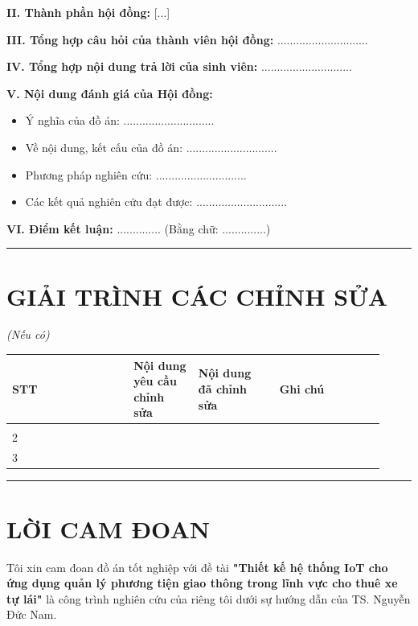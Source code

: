 \documentclass[13pt,a4paper]{extarticle}
\newcounter{none} %
\newcommand{\thesislongtableorignewline}{}
\let\thesislongtableorignewline\\
\renewcommand{\\}{\thesislongtableorignewline\hline}%
\let\\\thesislongtableorignewline
\newcommand{\majorheading}[1]{\clearpage\section*{#1}}
\newcommand{\frontmatterstart}{\clearpage\pagenumbering{roman}\setcounter{page}{1}}
\providecommand{\tightlist}{%
  \setlength{\itemsep}{0pt}\setlength{\parskip}{0pt}}
\begin{document}
\textbf{II. Thành phần hội đồng:} {[}...{]}

\textbf{III. Tổng hợp câu hỏi của thành viên hội đồng:}
.............................

\textbf{IV. Tổng hợp nội dung trả lời của sinh viên:}
.............................

\textbf{V. Nội dung đánh giá của Hội đồng:}

\begin{itemize}
\tightlist
\item
  Ý nghĩa của đồ án: .............................
\item
  Về nội dung, kết cấu của đồ án: .............................
\item
  Phương pháp nghiên cứu: .............................
\item
  Các kết quả nghiên cứu đạt được: .............................
\end{itemize}

\textbf{VI. Điểm kết luận:} .............. (Bằng chữ: ..............)

\begin{center}\rule{0.5\linewidth}{0.5pt}\end{center}

\majorheading{GIẢI TRÌNH CÁC CHỈNH SỬA}

\emph{(Nếu có)}

{\def\LTcaptype{none} %
\begin{longtable}{|p{0.30\linewidth}|p{0.16\linewidth}|p{0.20\linewidth}|p{0.26\linewidth}|}
\hline \textbf{STT} & \textbf{Nội dung yêu cầu chỉnh sửa} & \textbf{Nội dung đã chỉnh sửa} & \textbf{Ghi chú} \\
\hline
\endhead
\hline
\endlastfoot
1 & & & \\
2 & & & \\
3 & & & \\
\end{longtable}
}

\begin{center}\rule{0.5\linewidth}{0.5pt}\end{center}

\frontmatterstart
\majorheading{LỜI CAM ĐOAN}\label{lux1eddi-cam-ux111oan}

Tôi xin cam đoan đồ án tốt nghiệp với đề tài \textbf{"Thiết kế hệ thống
IoT cho ứng dụng quản lý phương tiện giao thông trong lĩnh vực cho thuê
xe tự lái"} là công trình nghiên cứu của riêng tôi dưới sự hướng dẫn của
TS. Nguyễn Đức Nam.
\end{document}
